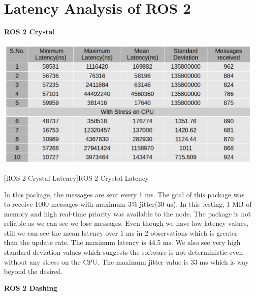 \documentclass[%
xelatex,
	oneside,		%
	12pt,			%
	parskip=half,	%
	abstracton,
	chapterprefix=true%
    appendixprefix=true]
{scrbook}
\begin{document}
		\section{Latency Analysis of ROS 2}
\vspace*{0.5cm}
{\bfseries ROS 2 Crystal}
\begin{center}
\includegraphics[scale=0.4]{fig/ros2crylatency.png}

[ROS 2 Crystal Latency]{ROS 2 Crystal Latency}
\label{tab:ros2crystallatency}
\end{center}
In this package, the messages are sent every 1 ms. The goal of this package was to receive 1000 messages with maximum 3\% jitter(30 us). In this testing, 1 MB of memory and high real-time priority was available to the node. The package is not reliable as we can see we lose messages. Even though we have low latency values, still we can see the mean latency over 1 ms in 2 observations which is greater than the update rate. The maximum latency is 44.5 ms. We also see very high standard deviation values which suggests the software is not deterministic even without any stress on the CPU. The maximum jitter value is 33 ms which is way beyond the desired.
\vspace*{0.5cm}


{\bfseries ROS 2 Dashing}
\vspace*{0.5cm}
\end{document}
